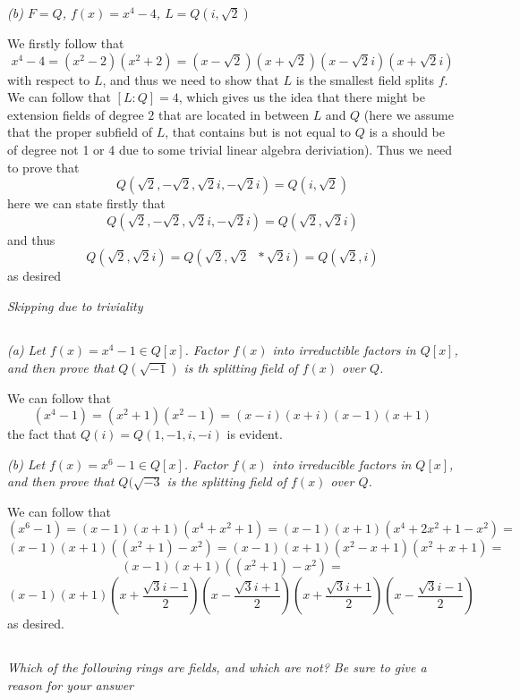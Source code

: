 \documentclass[11pt,oneside,titlepage]{book}
\DeclareMathOperator \inv {^{-1}}
\begin{document}
\textit{(b) $F = Q$, $f(x) = x^4 - 4$, $L = Q(i, \sqrt{2})$}

We firstly follow that
$$x^4 - 4 = (x^2 - 2)(x^2 + 2) =
(x - \sqrt{2})(x + \sqrt{2})(x - \sqrt{2}i)(x + \sqrt{2}i)$$ with
respect to $L$, and thus we need to show that $L$ is the smallest
field splits $f$. We can follow that $[L:Q] = 4$, which gives us the
idea that there might be extension fields of degree $2$ that are
located in between $L$ and $Q$ (here we assume that the proper
subfield of $L$, that contains but is not equal to $Q$ is a should be
of degree not 1 or 4 due to some trivial linear algebra deriviation).
Thus we need to prove that
$$Q(\sqrt{2}, -\sqrt{2}, \sqrt{2}i, -\sqrt{2}i) = Q(i, \sqrt{2})$$
here we can state firstly that
$$Q(\sqrt{2}, -\sqrt{2}, \sqrt{2}i, -\sqrt{2}i) = Q(\sqrt{2}, \sqrt{2} i)$$
and thus
$$  Q(\sqrt{2}, \sqrt{2} i) =  Q(\sqrt{2}, \sqrt{2} \inv * \sqrt{2} i) = Q(\sqrt{2}, i)$$
as desired

\textit{Skipping due to triviality}

\subsection{}

\textit{(a) Let $f(x) = x^4 - 1 \in Q[x]$. Factor $f(x)$ into irreductible factors in $Q[x]$,
  and then prove that $Q(\sqrt{-1})$ is th splitting field of $f(x)$ over $Q$.}

We can follow that
$$(x^4 - 1) = (x^2 + 1)(x^2 - 1) = (x - i)(x + i)(x - 1)(x + 1)$$
the fact that $Q(i) = Q(1, -1, i, -i)$ is evident.

\textit{(b) Let $f(x) = x^6 - 1 \in Q[x]$. Factor $f(x)$ into
  irreducible factors in $Q[x]$, and then prove that $Q(\sqrt{-3}$ is
  the splitting field of $f(x)$ over $Q$.}

We can follow that
$$(x^6 - 1) = (x - 1)(x + 1)(x^4 + x^2  + 1) = (x - 1)(x + 1)(x^4 + 2x^2  + 1 - x^2) = $$
$$ (x - 1)(x + 1)((x^2 + 1) - x^2) = (x - 1)(x + 1)(x^2 - x + 1)(x^2 + x + 1) = $$
$$ (x - 1)(x + 1)((x^2 + 1) - x^2) = $$
$$(x - 1)(x + 1)(x + \frac{\sqrt{3}i - 1}{2})
(x - \frac{\sqrt{3}i + 1}{2})(x + \frac{\sqrt{3}i + 1}{2})(x - \frac{\sqrt{3}i - 1}{2})
$$
as desired.

\subsection{}

\textit{Which of the following rings are fields, and which are not? Be sure to
  give a reason for your answer}
\end{document}
